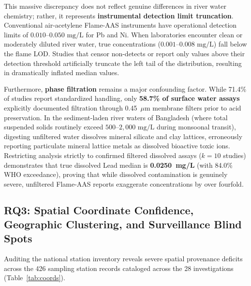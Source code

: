 \documentclass[authoryear,preprint,12pt]{elsarticle}
\begin{document}
This massive discrepancy does not reflect genuine differences in river water chemistry; rather, it represents \textbf{instrumental detection limit truncation}. Conventional air-acetylene Flame-AAS instruments have operational detection limits of $0.010\text{--}0.050\text{ mg/L}$ for Pb and Ni. When laboratories encounter clean or moderately diluted river water, true concentrations ($0.001\text{--}0.008\text{ mg/L}$) fall below the flame LOD. Studies that censor non-detects or report only values above their detection threshold artificially truncate the left tail of the distribution, resulting in dramatically inflated median values.

Furthermore, \textbf{phase filtration} remains a major confounding factor. While 71.4\% of studies report standardized handling, only \textbf{58.7\% of surface water assays} explicitly documented filtration through 0.45~$\mu\text{m}$ membrane filters prior to acid preservation. In the sediment-laden river waters of Bangladesh (where total suspended solids routinely exceed $500\text{--}2,000\text{ mg/L}$ during monsoonal transit), digesting unfiltered water dissolves mineral silicate and clay lattices, erroneously reporting particulate mineral lattice metals as dissolved bioactive toxic ions. Restricting analysis strictly to confirmed filtered dissolved assays ($k=10$ studies) demonstrates that true dissolved Lead median is \textbf{0.0250~mg/L} (with 84.0\% WHO exceedance), proving that while dissolved contamination is genuinely severe, unfiltered Flame-AAS reports exaggerate concentrations by over fourfold.

\subsection{RQ3: Spatial Coordinate Confidence, Geographic Clustering, and Surveillance Blind Spots}
Auditing the national station inventory reveals severe spatial provenance deficits across the 426 sampling station records cataloged across the 28 investigations (Table~\ref{tab:coords}).
\end{document}
